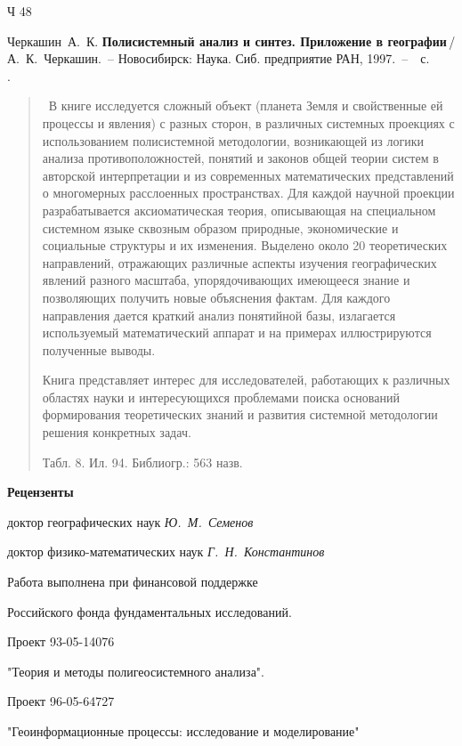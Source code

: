 \documentclass[12pt,draft,openany]{extbook}
\begin{document}
\noindent{}\begin{minipage}[t]{3em}
\noindent{}Ч 48%
\end{minipage}\hfill{}%
\begin{minipage}[t]{0.92\linewidth}
\setlength{\parindent}{3.5ex}

Черкашин~А.~К. {\bfseries Полисистемный анализ и синтез. Приложение в географии}\,{}/
А.~К.~Черкашин.~-- Новосибирск: Наука. Сиб. предприятие
РАН, 1997.~--~\pageref{LastPage}~с.\\[0.3em]
\ISBN{}.
\vspace{1em}

\begin{abstract}\
В книге исследуется сложный объект (планета Земля и свойственные ей процессы и явления) с разных сторон, в различных системных проекциях с использованием полисистемной методологии, возникающей из логики анализа противоположностей, понятий и законов общей теории систем в авторской интерпретации и из современных математических представлений о многомерных расслоенных пространствах. Для каждой научной проекции разрабатывается аксиоматическая теория, описывающая на специальном системном языке сквозным образом природные, экономические и социальные структуры и их изменения. Выделено около 20 теоретических направлений, отражающих различные аспекты изучения географических явлений разного масштаба, упорядочивающих имеющееся знание и позволяющих получить новые объяснения фактам. Для каждого направления дается краткий анализ понятийной базы, излагается используемый математический аппарат и на примерах иллюстрируются полученные выводы.

Книга представляет интерес для исследователей, работающих к различных областях науки и интересующихся проблемами поиска оснований формирования теоретических знаний и развития системной методологии решения конкретных задач.

Табл. 8. Ил. 94. Библиогр.: 563 назв.
\end{abstract}

\vspace{2em}
\centering
\textbf{Рецензенты}

доктор географических наук \textit{Ю.~М.~Семенов}

доктор физико-математических наук \textit{Г.~Н.~Константинов}
\vspace{1ex}

Работа выполнена при финансовой поддержке

Российского фонда фундаментальных исследований.

Проект 93-05-14076

"Теория и методы полигеосистемного анализа".

Проект 96-05-64727

"Геоинформационные процессы: исследование и моделирование"
\end{minipage}
\end{document}
